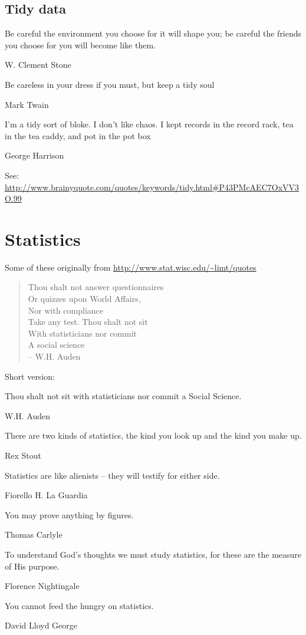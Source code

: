 \subsection{Tidy data}
\epigraph{Be careful the environment you choose for it will shape you; be careful the friends you choose for you will become like them.}{W. Clement Stone}

\epigraph{Be careless in your dress if you must, but keep a tidy soul}{Mark Twain}

\epigraph{I'm a tidy sort of bloke. I don't like chaos. I kept records in the record rack, tea in the tea caddy, and pot in the pot box}{George Harrison}

See: \url{http://www.brainyquote.com/quotes/keywords/tidy.html#P43PMcAEC7OxVV3O.99}

\section{Statistics}

Some of these originally from \url{http://www.stat.wisc.edu/~limt/quotes}

\begin{verse}
Thou shalt not answer questionnaires\\
Or quizzes upon World Affairs,\\
Nor with compliance\\
Take any test. Thou shalt not sit\\
With statisticians nor commit\\
A social science\\
-- W.H. Auden 
\end{verse}

Short version:
\epigraph{Thou shalt not sit with statisticians nor commit a Social Science.}{W.H. Auden}


\epigraph{There are two kinds of statistics, the kind you look up and the kind you make up.}{Rex Stout}

\epigraph{Statistics are like alienists -- they will testify for either side.}{Fiorello H. La Guardia}

\epigraph{You may prove anything by figures.}{Thomas Carlyle}


\epigraph{To understand God's thoughts we must study statistics, for these are the measure of His purpose.}{Florence Nightingale}

\epigraph{You cannot feed the hungry on statistics.}{David Lloyd George}

